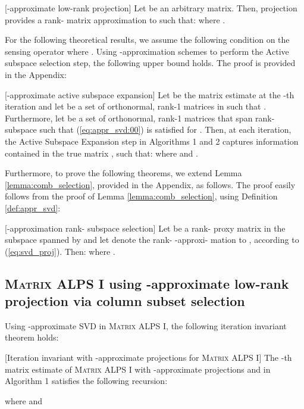 \documentclass[twocolumn]{svjour3}
\begin{document}
\begin{definition}{\label{def:appr_svd}}[-approximate low-rank projection]
Let  be an arbitrary matrix. Then,  projection provides a rank- matrix approximation to  such that:
 where .
\end{definition}

For the following theoretical results, we assume the following condition on the sensing operator   where . 
Using -approximation schemes to perform the Active subspace selection step, the following upper bound holds. The proof is provided in the Appendix:

\begin{lemma}\label{lemma:appr_act_subspace_exp}[-approximate active subspace expansion] Let  be the matrix estimate at the -th iteration and let  be a set of orthonormal, rank-1 matrices in  such that . Furthermore, let 
 be a set of orthonormal, rank-1 matrices that span rank- subspace such that (\ref{eq:appr_svd:00}) is satisfied for . Then, at each iteration, the Active Subspace Expansion step in Algorithms 1 and 2 captures information contained in the true matrix , such that:
 where  and . 
\end{lemma}

Furthermore, to prove the following theorems, we extend Lemma \ref{lemma:comb_selection}, provided in the Appendix, as follows. The proof easily follows from the proof of Lemma \ref{lemma:comb_selection}, using Definition \ref{def:appr_svd}:
\begin{lemma}{\label{lemma:appr_comb_selection}}[-approximation rank- subspace selection] Let  be a rank- proxy matrix in the subspace spanned by  and let  denote the rank- -approxi- mation to , according to (\ref{eq:svd_proj}). Then:
 where .
\end{lemma}

\subsection{\textsc{Matrix ALPS I} using -approximate low-rank projection via column subset selection}

Using -approximate SVD in \textsc{Matrix ALPS I}, the following iteration invariant theorem holds:

\begin{theorem}\label{thm:mALPS0_appr}[Iteration invariant with -approximate projections for \textsc{Matrix ALPS I}] The -th matrix estimate  of \textsc{Matrix ALPS I} with -approximate projections  and  in Algorithm 1 satisfies the following recursion:

where   and \\  \\ 
\end{theorem}
\end{document}

